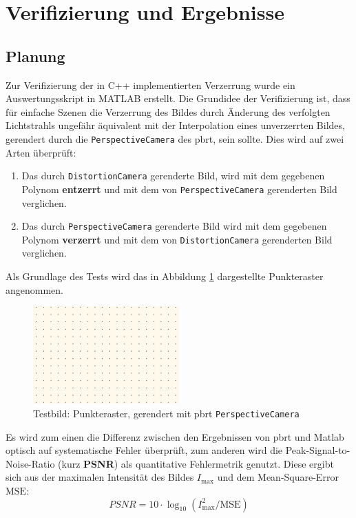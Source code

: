 \newpage
\section{Verifizierung und Ergebnisse}
\subsection{Planung}
Zur Verifizierung der in C++ implementierten Verzerrung wurde ein Auswertungsskript in MATLAB erstellt. Die Grundidee der Verifizierung ist, dass für einfache Szenen die Verzerrung des Bildes durch Änderung des verfolgten Lichtstrahls ungefähr äquivalent mit der Interpolation eines unverzerrten Bildes, gerendert durch die \texttt{PerspectiveCamera} des pbrt, sein sollte.
Dies wird auf zwei Arten überprüft:
\begin{enumerate}
	\item Das durch \texttt{DistortionCamera} gerenderte Bild, wird mit dem gegebenen Polynom \textbf{entzerrt} und mit dem von \texttt{PerspectiveCamera} gerenderten Bild verglichen.
	\item Das durch \texttt{PerspectiveCamera} gerenderte Bild wird mit dem gegebenen Polynom \textbf{verzerrt} und mit dem von \texttt{DistortionCamera} gerenderten Bild verglichen.
\end{enumerate}

Als Grundlage des Tests wird das in Abbildung \ref{fig:test_img} dargestellte Punkteraster angenommen. 

\begin{figure}[h]
	\centering
	\includegraphics[width=0.5\textwidth]{img/dot_perspective.png}
	\caption{Testbild: Punkteraster, gerendert mit pbrt \texttt{PerspectiveCamera}}
	\label{fig:test_img}
\end{figure}

Es wird zum einen die Differenz zwischen den Ergebnissen von pbrt und Matlab optisch auf systematische Fehler überprüft, zum anderen wird die Peak-Signal-to-Noise-Ratio (kurz \textbf{PSNR}) als quantitative Fehlermetrik genutzt.
Diese ergibt sich aus der maximalen Intensität des Bildes $I_\text{max}$ und dem Mean-Square-Error $\text{MSE}$:
\begin{equation}
	PSNR = 10\cdot \log_{10} (I_\text{max}^2/\text{MSE})
\end{equation}

